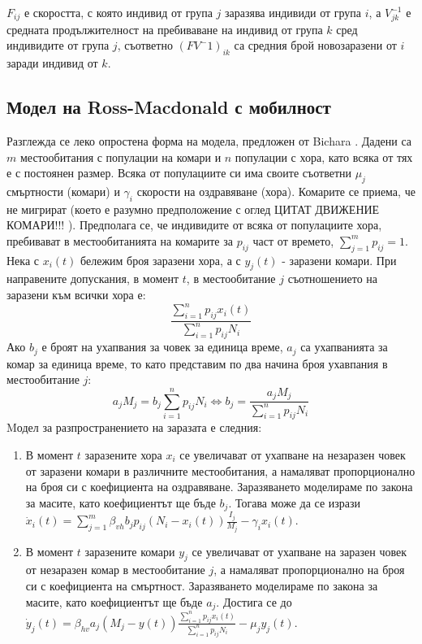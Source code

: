 $F_{ij}$ е скоростта, с която индивид от група $j$ заразява индивиди от група $i$, а $V^{-1}_{jk}$ е средната продължителност на пребиваване на индивид от група $k$ сред индивидите от група $j$, съответно $(F V^-1)_{ik}$ са средния брой новозаразени от $i$ заради индивид от $k$.

\subsection{Модел на Ross-Macdonald с мобилност}
Разглежда се леко опростена форма на модела, предложен от Bichara \cite{Bichara2016}. Дадени са $m$ местообитания с популации на комари и $n$ популации с хора, като всяка от тях е с постоянен размер. Всяка от популациите си има своите съответни $\mu_j$ смъртности (комари) и $\gamma_i$ скорости на оздравяване (хора). Комарите се приема, че не мигрират (което е разумно предположение с оглед \color{Red} ЦИТАТ ДВИЖЕНИЕ КОМАРИ!!!
\color{Black}). Предполага се, че индивидите от всяка от популациите хора, пребивават в местообитанията на комарите за $p_{ij}$ част от времето, $\sum_{j=1}^m p_{ij} = 1$. \\
Нека с $x_i(t)$ бележим броя заразени хора, а с $y_j(t)$ - заразени комари. При направените допускания, в момент $t$, в местообитание $j$ съотношението на заразени към всички хора е:
\begin{equation}
  \frac{\sum_{i=1}^n p_{ij} x_i(t)}{\sum_{i=1}^n p_{ij} N_i}
\end{equation}
Ако $b_j$ е броят на ухапвания за човек за единица време, $a_j$ са ухапванията за комар за единица време, то като представим по два начина броя ухавпания в местообитание $j$:
\begin{equation}
  a_j M_j = b_j \sum_{i=1}^n p_{ij} N_i \iff b_j = \frac{a_j M_j}{\sum_{i=1}^n p_{ij} N_i}
\end{equation}
Mодел за разпространението на заразата е следния:
\begin{enumerate}
  \item В момент $t$ заразените хора $x_i$ се увеличават от ухапване на незаразен човек от заразени комари в различните местообитания, а намаляват пропорционално на броя си с коефициента на оздравяване. Заразяването моделираме по закона за масите, като коефициентът ще бъде $b_j$. Тогава може да се изрази $\dot{x}_i(t) = \sum_{j=1}^{m} \beta_{vh} b_j p_{ij} (N_i - x_i(t)) \frac{I_j}{M_j} - \gamma_i x_i(t)$.
  \item В момент $t$ заразените комари $y_j$ се увеличават от ухапване на заразен човек от незаразен комар в местообитание $j$, а намаляват пропорционално на броя си с коефициента на смъртност. Заразяването моделираме по закона за масите, като коефициентът ще бъде $a_j$. Достига се до $\dot{y}_j(t) = \beta_{hv} a_j (M_j - y(t)) \frac{\sum_{i=1}^n p_{ij} x_i(t)}{\sum_{i=1}^n p_{ij} N_i} - \mu_j y_j(t)$.
\end{enumerate}
